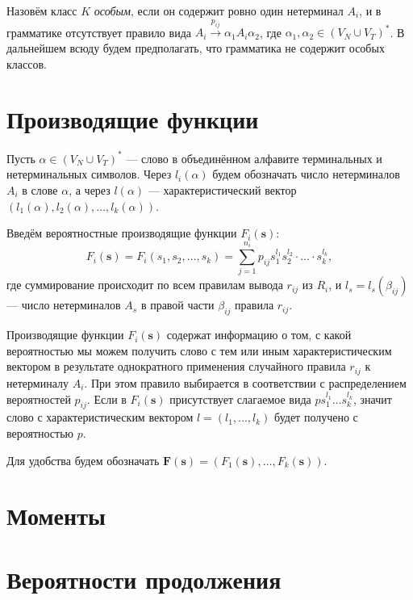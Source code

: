 \documentclass[12pt]{article}
\begin{document}
Назовём класс $K$ \textit{особым}, если он содержит ровно один нетерминал $A_i$, и в грамматике отсутствует правило вида $A_i \xrightarrow{p_{ij}} \alpha_1 A_i \alpha_2$, где $\alpha_1, \alpha_2 \in (V_N \cup V_T)^*$. В дальнейшем всюду будем предполагать, что грамматика не содержит особых классов.

\section{Производящие функции}

Пусть $\alpha \in (V_N \cup V_T)^*$ --- слово в объединённом алфавите терминальных и нетерминальных символов. Через $l_i(\alpha)$ будем обозначать число нетерминалов $A_i$ в слове $\alpha$, а через $l(\alpha)$ --- характеристический вектор $(l_1(\alpha), l_2(\alpha), \ldots, l_k(\alpha))$.

Введём вероятностные производящие функции $F_i(\textbf{s})$:
\begin{equation}
	 F_i(\textbf{s}) = F_i(s_1, s_2, \ldots, s_k) = \sum_{j = 1}^{n_i} p_{ij} s_1^{l_1} s_2^{l_2} \cdot \ldots \cdot s_k^{l_k},
\end{equation}
где суммирование происходит по всем правилам вывода $r_{ij}$ из $R_i$, и $l_s = l_s(\beta_{ij})$ --- число нетерминалов $A_s$ в правой части $\beta_{ij}$ правила $r_{ij}$.

\hrulefill

\begin{footnotesize}
Производящие функции $F_i(\textbf{s})$ содержат информацию о том, с какой вероятностью мы можем получить слово с тем или иным характеристическим вектором в результате однократного применения случайного правила $r_{ij}$ к нетерминалу $A_i$. При этом правило выбирается в соответствии с распределением вероятностей $p_{ij}$. Если в $F_i(\textbf{s})$ присутствует слагаемое вида $p s_1^{l_1} \ldots s_k^{l_k}$, значит слово с характеристическим вектором $l = (l_1, \ldots, l_k)$ будет получено с вероятностью $p$.
\end{footnotesize}

\hrulefill

Для удобства будем обозначать $\textbf{F}(\textbf{s}) = (F_1(\textbf{s}), \ldots, F_k(\textbf{s}))$.

\section{Моменты}



\section{Вероятности продолжения}
\end{document}
